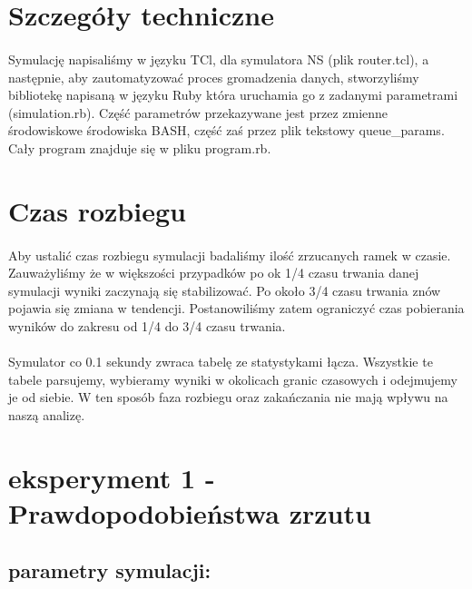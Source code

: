 \documentclass[a4paper]{article}
\begin{document}
\section{Szczegóły techniczne}


\paragraph{}
Symulację napisaliśmy w języku TCl, dla symulatora NS (plik router.tcl), a następnie, aby zautomatyzować proces gromadzenia danych, stworzyliśmy bibliotekę napisaną w języku Ruby która uruchamia go z zadanymi parametrami (simulation.rb). Część parametrów przekazywane jest przez zmienne środowiskowe środowiska BASH, część zaś przez plik tekstowy queue\_params. Cały program znajduje się w pliku program.rb.


\section{Czas rozbiegu}

\paragraph{}
Aby ustalić czas rozbiegu symulacji badaliśmy ilość zrzucanych ramek w czasie. Zauważyliśmy że w większości przypadków po ok 1/4 czasu trwania danej symulacji wyniki zaczynają się stabilizować. Po około 3/4 czasu trwania znów pojawia się zmiana w tendencji. Postanowiliśmy zatem ograniczyć czas pobierania wyników do zakresu od 1/4 do 3/4 czasu trwania.

\paragraph{}
Symulator co 0.1 sekundy zwraca tabelę ze statystykami łącza. Wszystkie te tabele parsujemy, wybieramy wyniki w okolicach granic czasowych i odejmujemy je od siebie. W ten sposób faza rozbiegu oraz zakańczania nie mają wpływu na naszą analizę.


\section{eksperyment 1 - Prawdopodobieństwa zrzutu}



\subsection{parametry symulacji:}
\end{document}
